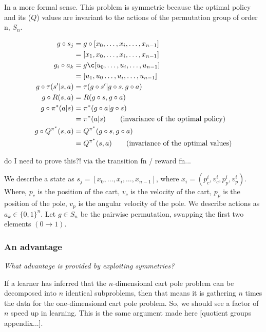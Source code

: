 In a more formal sense. This problem is symmetric because the optimal policy and its ($Q$) values are invariant to the actions of the permutation group of order n, $S_n$.

\begin{align*}
g \circ s_j &= g \circ [x_0, \dots, x_i, \dots, x_{n-1}] \\
&= [x_1, x_0, \dots, x_i, \dots, x_{n-1}] \\
g_i \circ a_k &= g \c[u_0, \dots, u_i, \dots, u_{n-1}] \\
&= [u_1, u_0 \dots, u_i, \dots, u_{n-1}] \\
g\circ \tau(s'|s, a) &= \tau(g\circ s'|g\circ s, g\circ a) \\
g\circ R(s, a) &= R(g\circ s, g\circ a) \\
g\circ \pi^{* }(a|s) &= \pi^{* }(g\circ a| g\circ s) \\
&= \pi^{* }(a|s) \tag{invariance of the optimal policy}\\
g\circ Q^{\pi^{* }}(s, a) &= Q^{\pi^{* }}(g\circ s, g\circ a) \\
&= Q^{\pi^{* }}(s, a) \tag{invariance of the optimal values}
\end{align*}

{\color{red}do I need to prove this?! via the transition fn / reward fn...}

We describe a state as $s_j = [x_0, \dots, x_i, \dots, x_{n-1}]$, where $x_i = (p_c^i, v_c^i, p_p^i, v_p^i)$. Where, $p_c$ is the position of the cart, $v_c$ is the velocity of the cart, $p_p$ is the position of the pole, $v_p$ is the angular velocity of the pole. We describe actions as $a_k \in \{0, 1\}^n$. Let $g\in S_n$ be the pairwise permutation, swapping the first two elements $(0\to 1)$.



\subsubsection{An advantage}

\begin{displayquote}
\textit{What advantage is provided by exploiting symmetries?}
\end{displayquote}

If a learner has inferred that the $n$-dimensional cart pole problem can be decomposed into $n$ identical subproblems,
then that means it is gathering $n$ times the data for the one-dimensional cart pole problem.
So, we should see a factor of $n$ speed up in learning.
This is the same argument made here [quotient groups appendix...].

